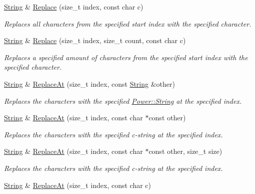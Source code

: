 \begin{DoxyCompactItemize}
\hyperlink{class_power_1_1_string}{String} \& \hyperlink{class_power_1_1_string_aaeba6635317522959a39eb0d2daf1bfa}{Replace} (size\+\_\+t index, const char c)
\begin{DoxyCompactList}\small\item\em Replaces all characters from the specified start index with the specified character. \end{DoxyCompactList}\item 
\hyperlink{class_power_1_1_string}{String} \& \hyperlink{class_power_1_1_string_a8bdd92abdc4f1e94ec9392aa2055c0a1}{Replace} (size\+\_\+t index, size\+\_\+t count, const char c)
\begin{DoxyCompactList}\small\item\em Replaces a specified amount of characters from the specified start index with the specified character. \end{DoxyCompactList}\item 
\hyperlink{class_power_1_1_string}{String} \& \hyperlink{class_power_1_1_string_a72ad0e1293452ac1251a6b6458669340}{Replace\+At} (size\+\_\+t index, const \hyperlink{class_power_1_1_string}{String} \&other)
\begin{DoxyCompactList}\small\item\em Replaces the characters with the specified \hyperlink{class_power_1_1_string}{Power\+::\+String} at the specified index. \end{DoxyCompactList}\item 
\hyperlink{class_power_1_1_string}{String} \& \hyperlink{class_power_1_1_string_af407db036d27c2fd06525801a6b84867}{Replace\+At} (size\+\_\+t index, const char $\ast$const other)
\begin{DoxyCompactList}\small\item\em Replaces the characters with the specified c-\/string at the specified index. \end{DoxyCompactList}\item 
\hyperlink{class_power_1_1_string}{String} \& \hyperlink{class_power_1_1_string_a92c3f4fffbddf76e78ecf8d8f2bd2791}{Replace\+At} (size\+\_\+t index, const char $\ast$const other, size\+\_\+t size)
\begin{DoxyCompactList}\small\item\em Replaces the characters with the specified c-\/string at the specified index. \end{DoxyCompactList}\item 
\hyperlink{class_power_1_1_string}{String} \& \hyperlink{class_power_1_1_string_ad5c423d2d84539a6d9a203d2916d9851}{Replace\+At} (size\+\_\+t index, const char c)

\end{DoxyCompactItemize}
